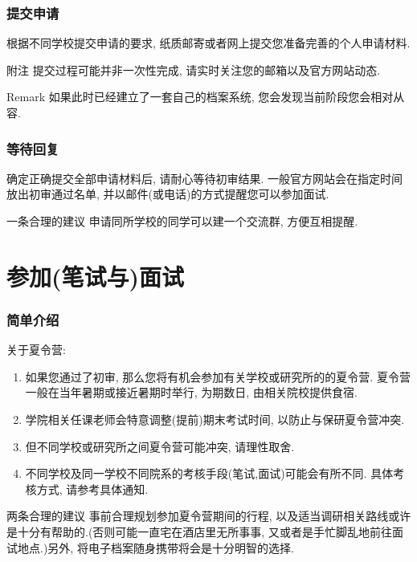 \documentclass[Blue,dvipsnames]{beamer}
\begin{document}
      \begin{frame}
      \frametitle{提交申请}
        根据不同学校提交申请的要求, 纸质邮寄或者网上提交您准备完善的个人申请材料.
        \begin{block}{附注}
          提交过程可能并非一次性完成, 请实时关注您的邮箱以及官方网站动态.
        \end{block}
        \begin{block}{Remark}
         如果此时已经建立了一套自己的档案系统, 您会发现当前阶段您会相对从容.
        \end{block}
      \end{frame}

      \begin{frame}
      \frametitle{等待回复}
      确定正确提交全部申请材料后, 请耐心等待初审结果. 一般官方网站会在指定时间放出初审通过名单, 并以邮件(或电话)的方式提醒您可以参加面试.
      \begin{block}{一条合理的建议}
        申请同所学校的同学可以建一个交流群, 方便互相提醒.  
      \end{block}
      \end{frame}

    \section{参加(笔试与)面试} 
    
    \begin{frame}
    \frametitle{简单介绍}
    关于夏令营:
    \begin{enumerate}[label=--]
      \item 如果您通过了初审, 那么您将有机会参加有关学校或研究所的的夏令营. 夏令营一般在当年暑期或接近暑期时举行, 为期数日, 由相关院校提供食宿.
      \item 学院相关任课老师会特意调整(提前)期末考试时间, 以防止与保研夏令营冲突.
      \item 但不同学校或研究所之间夏令营可能冲突, 请理性取舍.
      \item 不同学校及同一学校不同院系的考核手段(笔试,面试)可能会有所不同. 具体考核方式, 请参考具体通知.
    \end{enumerate}
    \begin{block}{两条合理的建议}
      \small
      事前合理规划参加夏令营期间的行程, 以及适当调研相关路线或许是十分有帮助的.(否则可能一直宅在酒店里无所事事, 又或者是手忙脚乱地前往面试地点.)另外, 将电子档案随身携带将会是十分明智的选择.
    \end{block}
    \end{frame}
\end{document}

